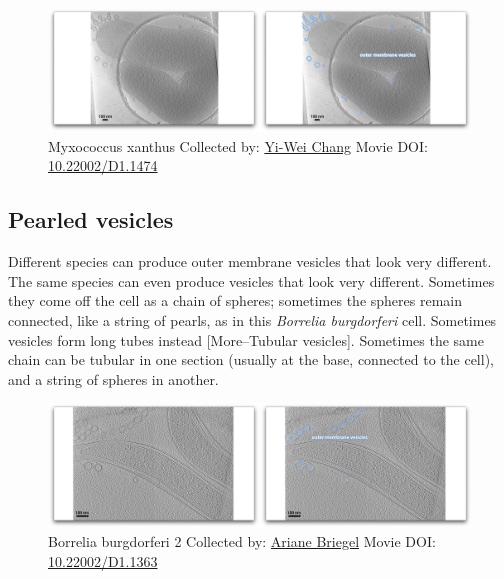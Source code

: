 \documentclass[]{tufte-book}
\begin{document}
\begin{figure}
\includegraphics{movie_stills/2_4} \caption[Myxococcus xanthus Collected by:
\protect\hyperlink{yi-wei_chang}{Yi-Wei Chang} Movie DOI:
\href{https://doi.org/10.22002/D1.1474}{10.22002/D1.1474}]{Myxococcus xanthus Collected by:
\protect\hyperlink{yi-wei_chang}{Yi-Wei Chang} Movie DOI:
\href{https://doi.org/10.22002/D1.1474}{10.22002/D1.1474}}\label{fig:2-4}
\end{figure}

\hypertarget{Pearled_vesicles}{\subsection{Pearled
vesicles}\label{Pearled_vesicles}}

Different species can produce outer membrane vesicles that look very
different. The same species can even produce vesicles that look very
different. Sometimes they come off the cell as a chain of spheres;
sometimes the spheres remain connected, like a string of pearls, as in
this \emph{Borrelia burgdorferi} cell. Sometimes vesicles form long
tubes instead {[}More--Tubular vesicles{]}. Sometimes the same chain can
be tubular in one section (usually at the base, connected to the cell),
and a string of spheres in another.





\begin{figure}
\includegraphics{movie_stills/2_4a} \caption[Borrelia burgdorferi 2 Collected by:
\protect\hyperlink{ariane_briegel}{Ariane Briegel} Movie DOI:
\href{https://doi.org/10.22002/D1.1363}{10.22002/D1.1363}]{Borrelia burgdorferi 2 Collected by:
\protect\hyperlink{ariane_briegel}{Ariane Briegel} Movie DOI:
\href{https://doi.org/10.22002/D1.1363}{10.22002/D1.1363}}\label{fig:2-4a}
\end{figure}
\end{document}
